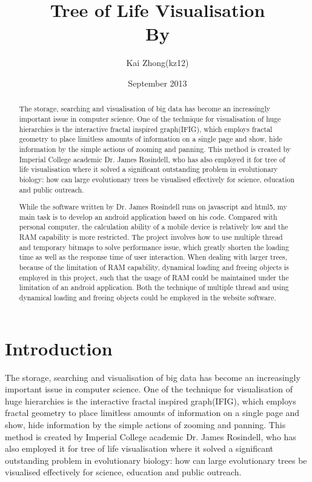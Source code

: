 \documentclass[MSc]{icldt}
\title{Tree of Life Visualisation \\ By}
\author{Kai Zhong(kz12)}
\date{September 2013}
\begin{document}
\maketitle

\begin{abstract}

The storage, searching and visualisation of big data has become an increasingly important issue in computer science. One of the technique for visualisation of huge hierarchies is the interactive fractal inspired graph(IFIG), which employs fractal geometry to place limitless amounts of information on a single page and show, hide information by the simple actions of zooming and panning. This method is created by Imperial College academic Dr. James Rosindell, who has also employed it for tree of life visualisation where it solved a significant outstanding problem in evolutionary biology: how can large evolutionary trees be visualised effectively for science, education and public outreach.

While the software written by Dr. James Rosindell runs on javascript and html5, my main task is to develop an android application based on his code. Compared with personal computer, the calculation ability of a mobile device is relatively low and the RAM capability is more restricted. The project involves how to use multiple thread and temporary bitmaps to solve performance issue, which greatly shorten the loading time as well as the response time of user interaction. When dealing with larger trees, because of the limitation of RAM capability, dynamical loading and freeing objects is employed in this project, such that the usage of RAM could be maintained under the limitation of an android application. 
Both the technique of multiple thread and using dynamical loading and freeing objects could be employed in the website software.

\end{abstract}

\makededication

\tableofcontents
\listoftables
\listoffigures

\chapter{Introduction}

The storage, searching and visualisation of big data has become an increasingly important issue in computer science. One of the technique for visualisation of huge hierarchies is the interactive fractal inspired graph(IFIG), which employs fractal geometry to place limitless amounts of information on a single page and show, hide information by the simple actions of zooming and panning. This method is created by Imperial College academic Dr. James Rosindell, who has also employed it for tree of life visualisation where it solved a significant outstanding problem in evolutionary biology: how can large evolutionary trees be visualised effectively for science, education and public outreach.
\end{document}
